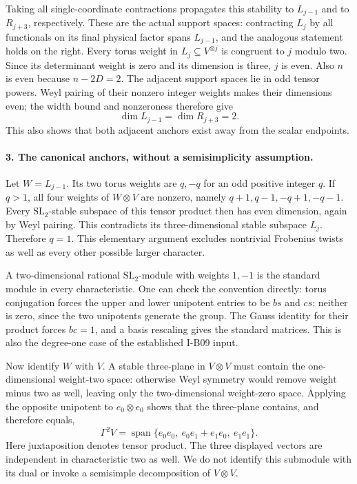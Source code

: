 Taking all single-coordinate contractions propagates this
stability to $L_{j-1}$ and to $R_{j+3}$, respectively. These
are the actual support spaces: contracting $L_j$ by all
functionals on its final physical factor spans $L_{j-1}$,
and the analogous statement holds on the right. Every torus
weight in $L_j\subseteq V^{\otimes j}$ is congruent to $j$
modulo two. Since its determinant weight is zero and its
dimension is three, $j$ is even. Also $n$ is even because
$n-2D=2$. The adjacent support spaces lie in odd tensor powers.
Weyl pairing of their nonzero integer weights makes their
dimensions even; the width bound and nonzeroness therefore give
\[
 \dim L_{j-1}=\dim R_{j+3}=2.
 \tag{I.136}
\]
This also shows that both adjacent anchors exist away from the
scalar endpoints.

\paragraph{3. The canonical anchors, without a semisimplicity assumption.}
Let $W=L_{j-1}$. Its two torus weights are $q,-q$ for an odd
positive integer $q$. If $q>1$, all four weights of $W\otimes V$
are nonzero, namely $q+1,q-1,-q+1,-q-1$. Every
$\mathrm{SL}_2$-stable subspace of this tensor product then has
even dimension, again by Weyl pairing. This contradicts its
three-dimensional stable subspace $L_j$. Therefore $q=1$.
This elementary argument excludes nontrivial Frobenius twists
as well as every other possible larger character.

A two-dimensional rational $\mathrm{SL}_2$-module with weights
$1,-1$ is the standard module in every characteristic. One can
check the convention directly: torus conjugation forces the
upper and lower unipotent entries to be $b s$ and $c s$;
neither is zero, since the two unipotents generate the group.
The Gauss identity for their product forces $bc=1$, and a
basis rescaling gives the standard matrices. This is also the
degree-one case of the established I-B09 input.

Now identify $W$ with $V$. A stable three-plane in $V\otimes V$
must contain the one-dimensional weight-two space: otherwise
Weyl symmetry would remove weight minus two as well, leaving
only the two-dimensional weight-zero space. Applying the
opposite unipotent to $e_0\otimes e_0$ shows that the three-plane
contains, and therefore equals,
\[
 \Gamma^2 V=\operatorname{span}\{
 e_0e_0,\ e_0e_1+e_1e_0,\ e_1e_1\}.
 \tag{I.137}
\]
Here juxtaposition denotes tensor product. The three displayed
vectors are independent in characteristic two as well. We do
not identify this submodule with its dual or invoke a
semisimple decomposition of $V\otimes V$.


